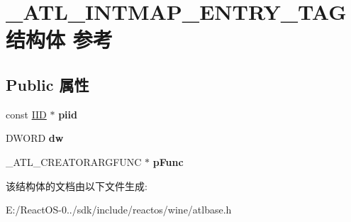 \hypertarget{struct___a_t_l___i_n_t_m_a_p___e_n_t_r_y___t_a_g}{}\section{\+\_\+\+A\+T\+L\+\_\+\+I\+N\+T\+M\+A\+P\+\_\+\+E\+N\+T\+R\+Y\+\_\+\+T\+A\+G结构体 参考}
\label{struct___a_t_l___i_n_t_m_a_p___e_n_t_r_y___t_a_g}
\subsection*{Public 属性}
\begin{DoxyCompactItemize}
\item 
\mbox{\label{struct___a_t_l___i_n_t_m_a_p___e_n_t_r_y___t_a_g_a9da58d307b1efea5d8650fc17fc72351}} 
const \hyperlink{struct___i_i_d}{I\+ID} $\ast$ {\bfseries piid}
\item 
\mbox{\label{struct___a_t_l___i_n_t_m_a_p___e_n_t_r_y___t_a_g_a5c3bb320038eea47d7ab420b079e50a7}} 
D\+W\+O\+RD {\bfseries dw}
\item 
\mbox{\label{struct___a_t_l___i_n_t_m_a_p___e_n_t_r_y___t_a_g_a97a9ba87a921b6b97f99351a5707fb29}} 
\+\_\+\+A\+T\+L\+\_\+\+C\+R\+E\+A\+T\+O\+R\+A\+R\+G\+F\+U\+NC $\ast$ {\bfseries p\+Func}
\end{DoxyCompactItemize}


该结构体的文档由以下文件生成\+:\begin{DoxyCompactItemize}
\item 
E\+:/\+React\+O\+S-\/0../sdk/include/reactos/wine/atlbase.\+h\end{DoxyCompactItemize}
